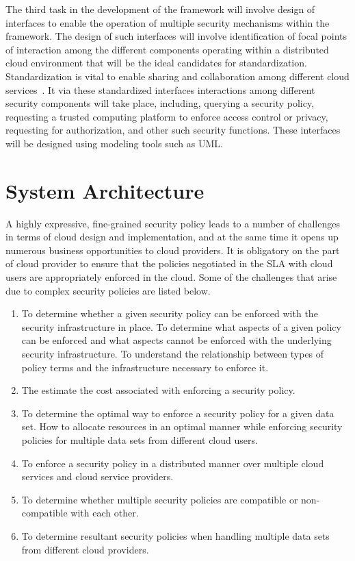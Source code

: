 \documentclass[10pt, conference, compsocconf]{IEEEtran}
\begin{document}
The third task in the development of the framework will involve design of interfaces to enable the operation of multiple security mechanisms within the framework. The design of such interfaces will involve identification of  focal points of interaction among the different components operating within a distributed cloud environment that will be the ideal candidates for standardization. Standardization is vital to enable sharing and collaboration among different cloud services~\cite{HPCloud1}. It via these standardized interfaces interactions among different security components will take place, including, querying a security policy, requesting a trusted computing platform to enforce access control or privacy, requesting for authorization, and other such security functions. These interfaces will be designed using modeling tools such as UML.


\section{System Architecture}
A highly expressive, fine-grained security policy leads to a number of challenges in terms of cloud design and implementation, and at the same time it  opens up numerous business opportunities to cloud providers. It is obligatory on the part of cloud provider to ensure that the policies negotiated in the SLA with cloud users are appropriately enforced in the cloud. Some of the challenges that arise due to complex security policies are listed below. 

\begin{enumerate}
\item To determine whether a given security policy can be enforced with the security infrastructure in place. To determine what aspects of a given policy can be enforced and what aspects cannot be enforced with the underlying security infrastructure. To understand the relationship between types of policy terms  and the infrastructure necessary to enforce it. 
\item The estimate the cost associated with enforcing a security policy.
\item To determine the optimal way to enforce a security policy for a given data set. How to allocate resources in an optimal manner while enforcing security policies for multiple data sets from different cloud users. 
\item To enforce a security policy in a distributed manner over multiple cloud services and cloud service providers.
\item To determine whether multiple security policies are compatible or non-compatible with each other.
\item To determine resultant security policies when handling multiple data sets from different cloud providers.
\end{enumerate}
\end{document}
